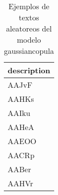 \begin{table}[H]
\centering
\fontsize{8}{14}\selectfont
\caption{Ejemplos de textos aleatoreos del modelo gaussiancopula}
\label{table-sample10-economicos-a-1-gaussiancopula-text}
\begin{tabular}{|m{45em}|}
\hline
\rowcolor[gray]{0.8}
description \\
\hline AAJvF \\
\hline AAHKs \\
\hline AAIku \\
\hline AAHeA \\
\hline AAEOO \\
\hline AACRp \\
\hline AABer \\
\hline AAHVr \\
\hline
\end{tabular}
\end{table}
